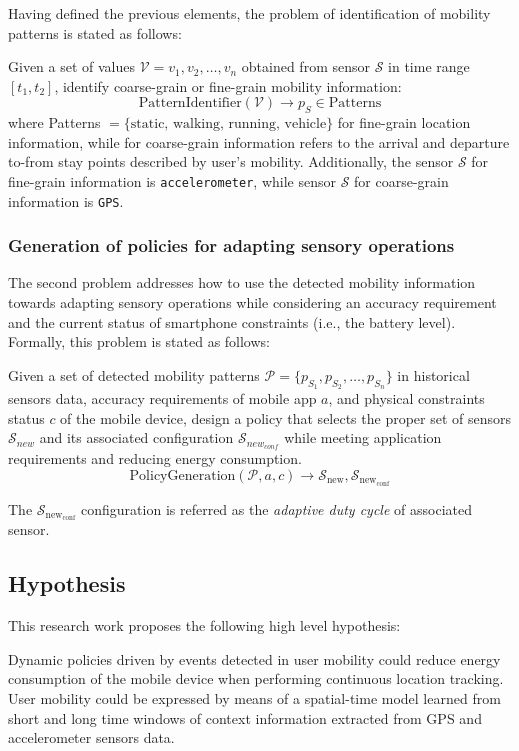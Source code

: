\documentclass[ENG,PhD]{cinvestav}
\begin{document}
Having defined the previous elements, the problem of identification of mobility patterns is stated as follows:
\begin{displayquote}
Given a set of values $\mathcal{V} = v_1,v_2,\ldots,v_n$ obtained from sensor $\mathcal{S}$ in time range $[t_1,t_2]$, identify coarse-grain or fine-grain mobility information:
$$
\text{PatternIdentifier}(\mathcal{V}) \rightarrow p_S \in \text{Patterns}
$$
where Patterns  $ = \{ \text{static, walking, running, vehicle} \}$ for fine-grain location information, while for coarse-grain information refers to the arrival and departure to-from stay points described by user's mobility.
Additionally, the sensor $\mathcal{S}$ for fine-grain information is \verb|accelerometer|, while sensor $\mathcal{S}$ for coarse-grain information is \verb|GPS|.
\end{displayquote}

\subsubsection{Generation of policies for adapting sensory operations}
The second problem addresses how to use the detected mobility information towards adapting sensory operations while considering an accuracy requirement and the current status of smartphone constraints (i.e., the battery level).
Formally, this problem is stated as follows:

\begin{displayquote}
Given a set of detected mobility patterns $\mathcal{P} = \{ p_{S_1}, p_{S_2}, \ldots, p_{S_n} \}$ in historical sensors data, accuracy requirements of mobile app $a$, and physical constraints status $c$ of the mobile device, design a policy that selects the proper set of sensors $\mathcal{S}_{new}$ and its associated configuration $\mathcal{S}_{new_{conf}}$  while meeting application requirements and reducing energy consumption.
$$
  \text{PolicyGeneration}( \mathcal{P}, a, c ) \longrightarrow{} \mathcal{S}_{\text{new}}, \mathcal{S}_{\text{new}_{\text{conf}}}
$$

The $\mathcal{S}_{\text{new}_{\text{conf}}}$ configuration is referred as the \emph{adaptive duty cycle} of associated sensor.
\end{displayquote}


\subsection{Hypothesis}
This research work proposes the following high level hypothesis:
\begin{displayquote}
  Dynamic policies driven by events detected in user mobility could reduce energy consumption of the mobile device when performing continuous location tracking.
  User mobility could be expressed by means of a spatial-time model learned from short and long time windows of context information extracted from GPS and accelerometer sensors data.
\end{displayquote}
\end{document}
